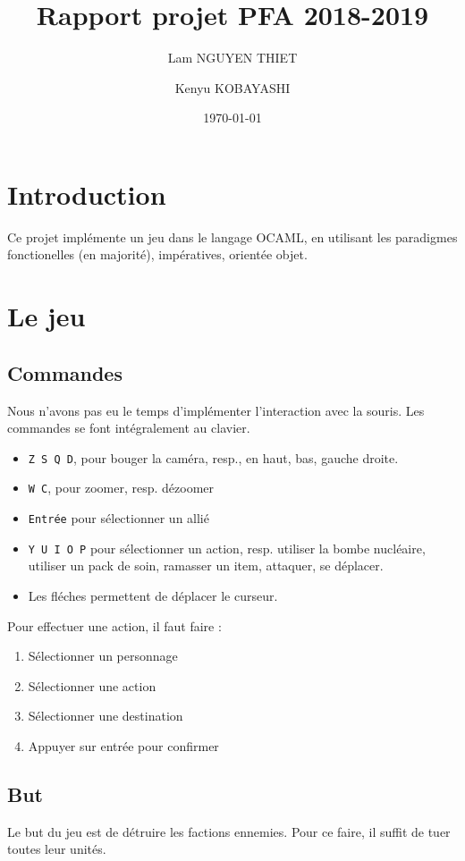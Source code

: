 \documentclass{article}
\title{Rapport projet PFA 2018-2019}
\date{\today}
\author{Lam NGUYEN THIET
\and Kenyu KOBAYASHI}
\begin{document}
\maketitle
\tableofcontents
\newpage
\newpage
\section{Introduction}
Ce projet implémente un jeu dans le langage OCAML, en utilisant les paradigmes fonctionelles (en majorité), impératives, orientée objet.

\section{Le jeu}
\subsection{Commandes}
Nous n'avons pas eu le temps d'implémenter l'interaction avec la souris. Les commandes se font intégralement
au clavier.
\begin{itemize}
    \item \texttt{Z S Q D}, pour bouger la caméra, resp., en haut, bas, gauche droite.
    \item \texttt{W C}, pour zoomer, resp. dézoomer
    \item \texttt{Entrée} pour sélectionner un allié
    \item \texttt{Y U I O P} pour sélectionner un action, resp. utiliser la bombe nucléaire, utiliser un pack de soin, ramasser un item, attaquer, se déplacer.
    \item Les fléches permettent de déplacer le curseur.
\end{itemize}

Pour effectuer une action, il faut faire :
\begin{enumerate}
    \item Sélectionner un personnage
    \item Sélectionner une action
    \item Sélectionner une destination
    \item Appuyer sur entrée pour confirmer
    
\end{enumerate}
\subsection{But}
Le but du jeu est de détruire les factions ennemies. Pour ce faire, il suffit de tuer toutes leur unités.
\end{document}
